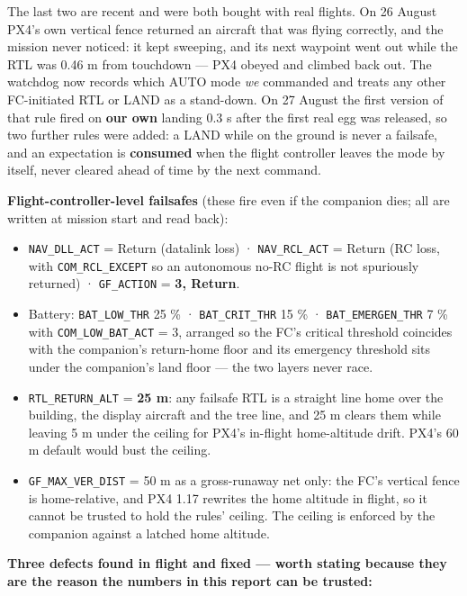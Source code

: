 \documentclass[
  10pt,
  a4paper,
  titlepage]{article}
\providecommand{\tightlist}{%
  \setlength{\itemsep}{0pt}\setlength{\parskip}{0pt}}
\begin{document}
The last two are recent and were both bought with real flights. On 26
August PX4's own vertical fence returned an aircraft that was flying
correctly, and the mission never noticed: it kept sweeping, and its next
waypoint went out while the RTL was 0.46 m from touchdown --- PX4 obeyed
and climbed back out. The watchdog now records which AUTO mode \emph{we}
commanded and treats any other FC-initiated RTL or LAND as a stand-down.
On 27 August the first version of that rule fired on \textbf{our own}
landing 0.3 s after the first real egg was released, so two further
rules were added: a LAND while on the ground is never a failsafe, and an
expectation is \textbf{consumed} when the flight controller leaves the
mode by itself, never cleared ahead of time by the next command.

\textbf{Flight-controller-level failsafes} (these fire even if the
companion dies; all are written at mission start and read back):

\begin{itemize}
\tightlist
\item
  \texttt{NAV\_DLL\_ACT} = Return (datalink loss) ·
  \texttt{NAV\_RCL\_ACT} = Return (RC loss, with
  \texttt{COM\_RCL\_EXCEPT} so an autonomous no-RC flight is not
  spuriously returned) · \texttt{GF\_ACTION} = \textbf{3, Return}.
\item
  Battery: \texttt{BAT\_LOW\_THR} 25 \% · \texttt{BAT\_CRIT\_THR} 15 \%
  · \texttt{BAT\_EMERGEN\_THR} 7 \% with \texttt{COM\_LOW\_BAT\_ACT} =
  3, arranged so the FC's critical threshold coincides with the
  companion's return-home floor and its emergency threshold sits under
  the companion's land floor --- the two layers never race.
\item
  \texttt{RTL\_RETURN\_ALT} = \textbf{25 m}: any failsafe RTL is a
  straight line home over the building, the display aircraft and the
  tree line, and 25 m clears them while leaving 5 m under the ceiling
  for PX4's in-flight home-altitude drift. PX4's 60 m default would bust
  the ceiling.
\item
  \texttt{GF\_MAX\_VER\_DIST} = 50 m as a gross-runaway net only: the
  FC's vertical fence is home-relative, and PX4 1.17 rewrites the home
  altitude in flight, so it cannot be trusted to hold the rules'
  ceiling. The ceiling is enforced by the companion against a latched
  home altitude.
\end{itemize}

\textbf{Three defects found in flight and fixed --- worth stating
because they are the reason the numbers in this report can be trusted:}
\end{document}
